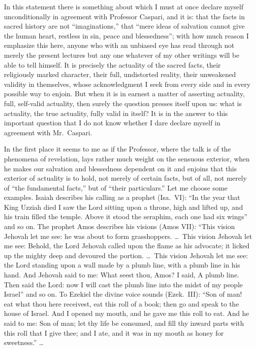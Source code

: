 \documentclass[12pt]{book}
\newcommand{\opage}[1]{\marginnote{\footnotesize\textit{[#1]}}}
\begin{document}
In this statement there is something about which I must at once declare
myself unconditionally in agreement with Professor Caspari, and it is:
that the facts in sacred history are not ``imaginations,'' that ``mere
ideas of salvation cannot give the human heart, restless in sin, peace
and blessedness''; with how much reason I emphasize this here, anyone who
with an unbiased eye has read through not merely the present lectures but
any one whatever of my other writings will be able to tell himself. It is
precisely the actuality of the sacred facts, their religiously marked
character, their full, undistorted reality, their unweakened validity in
themselves, whose acknowledgment I seek from every side and in every
possible way to enjoin. But when it is in earnest a matter of asserting
actuality, full, self-valid actuality, then surely the question presses
itself upon us: what is actuality, the true actuality, fully valid in
itself? It is in the answer to this important question that I do not
know whether I dare declare myself in agreement with Mr.\ Caspari.

In the first place it seems to me as if the Professor, where the talk is
of the phenomena of revelation, lays rather much weight on the sensuous
exterior, when he makes our salvation and blessedness dependent on it and
enjoins that this exterior of actuality is to hold, not merely of certain
facts, but of all, not merely of ``the fundamental facts,'' but of ``their
particulars.'' Let me choose some examples. Isaiah describes his calling
as a prophet (Isa.\ VI): ``In the year that King Uzziah died I saw the
Lord sitting upon a throne, high and lifted up, and his train filled the
temple. Above it stood the seraphim, each one had six wings''
\opage{300}\setcounter{footnote}{0}%
and so on. The prophet Amos describes his visions (Amos VII): ``This vision
Jehovah let me see: he was about to form grasshoppers. \ldots\ This
vision Jehovah let me see: Behold, the Lord Jehovah called upon the flame
as his advocate; it licked up the mighty deep and devoured the portion.
\ldots\ This vision Jehovah let me see: the Lord standing upon a wall
made by a plumb line, with a plumb line in his hand. And Jehovah said to
me: What seest thou, Amos? I said, A plumb line. Then said the Lord: now
I will cast the plumb line into the midst of my people Israel'' and so on.
To Ezekiel the divine voice sounds (Ezek.\ III): ``Son of man! eat what
thou here receivest, eat this roll of a book; then go and speak to the
house of Israel. And I opened my mouth, and he gave me this roll to eat.
And he said to me: Son of man; let thy life be consumed, and fill thy
inward parts with this roll that I give thee; and I ate, and it was in my
mouth as honey for sweetness.'' \ldots
\end{document}
